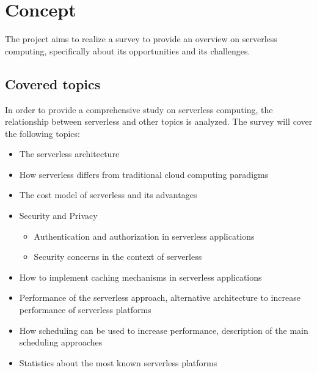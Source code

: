 \documentclass{scrartcl}
\begin{document}




\newpage
\section{Concept}\label{concept}

The project aims to realize a survey to provide an overview on serverless computing, specifically about its opportunities and its challenges.

\subsection{Covered topics}

In order to provide a comprehensive study on serverless computing, the relationship between serverless and other topics is analyzed. The survey will cover the following topics:

\begin{itemize}
  \item The serverless architecture
  \item How serverless differs from traditional cloud computing paradigms
  \item The cost model of serverless and its advantages
  \item Security and Privacy
  \begin{itemize}
    \item Authentication and authorization in serverless applications
    \item Security concerns in the context of serverless
  \end{itemize}
  \item How to implement caching mechanisms in serverless applications
  \item Performance of the serverless approach, alternative architecture to increase performance of serverless platforms
  \item How scheduling can be used to increase performance, description of the main scheduling approaches
  \item Statistics about the most known serverless platforms
\end{itemize}
\end{document}
